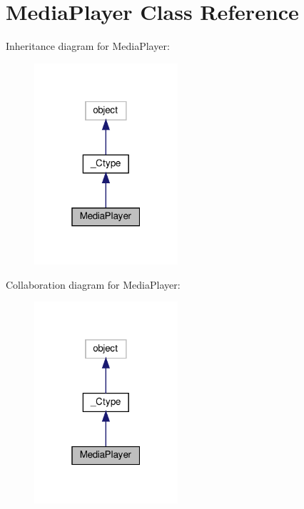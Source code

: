 \hypertarget{classvlc_1_1_media_player}{}\section{Media\+Player Class Reference}
\label{classvlc_1_1_media_player}


Inheritance diagram for Media\+Player\+:
\nopagebreak
\begin{figure}[H]
\begin{center}
\leavevmode
\includegraphics[width=151pt]{classvlc_1_1_media_player__inherit__graph}
\end{center}
\end{figure}


Collaboration diagram for Media\+Player\+:
\nopagebreak
\begin{figure}[H]
\begin{center}
\leavevmode
\includegraphics[width=151pt]{classvlc_1_1_media_player__coll__graph}
\end{center}
\end{figure}
